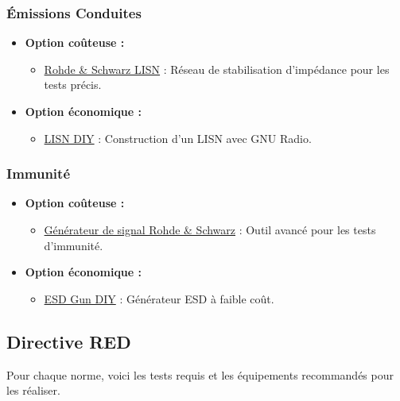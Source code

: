 \documentclass[a4paper,12pt]{article}
\begin{document}
\subsubsection{Émissions Conduites}
\begin{itemize}
    \item \textbf{Option coûteuse :}
          \begin{itemize}
              \item \href{https://www.rohde-schwarz.com/fr/produits/test-et-mesure/tests-conduits/rs-hm6050-two-line-v-network-lisn_63493-48135.html}{Rohde \& Schwarz LISN} : Réseau de stabilisation d'impédance pour les tests précis.
          \end{itemize}
    \item \textbf{Option économique :}
          \begin{itemize}
              \item \href{https://hackaday.io/project/181265-diy-cispr-25-lisn}{LISN DIY} : Construction d’un LISN avec GNU Radio.
          \end{itemize}
\end{itemize}

\subsubsection{Immunité}
\begin{itemize}
    \item \textbf{Option coûteuse :}
          \begin{itemize}
              \item \href{https://www.keysight.com/us/en/assets/7018-05702/technical-overviews/5992-2241.pdf}{Générateur de signal Rohde \& Schwarz} : Outil avancé pour les tests d’immunité.
          \end{itemize}
    \item \textbf{Option économique :}
          \begin{itemize}
              \item \href{https://www.crowdsupply.com/era-instruments/erasynth-micro}{ESD Gun DIY} : Générateur ESD à faible coût.
          \end{itemize}
\end{itemize}

\newpage

\subsection{Directive RED}
Pour chaque norme, voici les tests requis et les équipements recommandés pour les réaliser.
\end{document}
